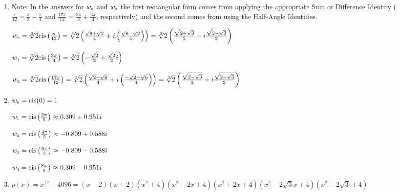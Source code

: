 \begin{enumerate}
\begin{multicols}{3}
$w_{\text{\tiny$3$}} = 3\text{cis}\left(\frac{7\pi}{6}\right) =  -\frac{3\sqrt{3}}{2}-\frac{3}{2}i$

$w_{\text{\tiny$4$}} = 3\text{cis}\left(-\frac{3\pi}{2}\right) = -3i$

$w_{\text{\tiny$5$}} = 3\text{cis}\left(-\frac{11\pi}{6}\right) = \frac{3\sqrt{3}}{2} - \frac{3}{2}i$

\end{multicols}


\item Note: In the answers for $w_{\text{\tiny$0$}}$ and $w_{\text{\tiny$2$}}$ the first rectangular form comes from applying the appropriate Sum or Difference Identity ($\frac{\pi}{12} = \frac{\pi}{3} - \frac{\pi}{4}$ and $\frac{17\pi}{12} = \frac{2\pi}{3} + \frac{3\pi}{4}$, respectively) and the second comes from using the Half-Angle Identities. 

$w_{\text{\tiny$0$}} = \sqrt[3]{2} \text{cis}\left(\frac{\pi}{12}\right) = \sqrt[3]{2}\left( \frac{\sqrt{6} + \sqrt{2}}{4} + i\left( \frac{\sqrt{6} - \sqrt{2}}{4} \right) \right) = \sqrt[3]{2}\left( \frac{\sqrt{2 + \sqrt{3}}}{2} + i\frac{\sqrt{2 - \sqrt{3}}}{2} \right)$ 
 
$w_{\text{\tiny$1$}} = \sqrt[3]{2} \text{cis}\left(\frac{3\pi}{4}\right) = \sqrt[3]{2} \left( -\frac{\sqrt{2}}{2} + \frac{\sqrt{2}}{2}i \right)$ 

$w_{\text{\tiny$2$}} = \sqrt[3]{2} \text{cis}\left(\frac{17\pi}{12}\right) = \sqrt[3]{2}\left( \frac{\sqrt{2} - \sqrt{6}}{4} + i\left( \frac{-\sqrt{2} - \sqrt{6}}{4} \right) \right) = \sqrt[3]{2}\left( \frac{\sqrt{2 - \sqrt{3}}}{2} + i\frac{\sqrt{2 + \sqrt{3}}}{2} \right)$

\item $w_{\text{\tiny$0$}} = \text{cis}(0) = 1$

$w_{\text{\tiny$1$}} = \text{cis}\left(\frac{2\pi}{5}\right) \approx 0.309 + 0.951i$

$w_{\text{\tiny$2$}} = \text{cis}\left(\frac{4\pi}{5}\right) \approx -0.809 + 0.588i$

$w_{\text{\tiny$3$}} = \text{cis}\left(\frac{6\pi}{5}\right) \approx -0.809 - 0.588i$

$w_{\text{\tiny$4$}} = \text{cis}\left(\frac{8\pi}{5}\right) \approx 0.309 - 0.951i$

\item $p(x) = x^{12} - 4096 = (x - 2)(x + 2)(x^{2} + 4)(x^{2} - 2x + 4)(x^{2} + 2x + 4)(x^{2} - 2\sqrt{3}x + 4)(x^{2} + 2\sqrt{3} + 4)$

\end{enumerate}



